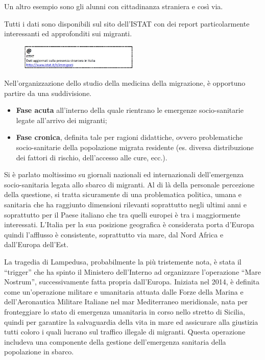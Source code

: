 Un altro esempio sono gli alunni con cittadinanza straniera e così via.

Tutti i dati sono disponibili sul sito dell'ISTAT con dei report
particolarmente interessanti ed approfonditi sui migranti.

\begin{figure}[!ht]
\centering
	\includegraphics[width=0.5\textwidth]{26/image15.jpeg}
	\end{figure}

Nell'organizzazione dello studio della medicina della migrazione, è
opportuno partire da una suddivisione.

\begin{itemize}
\item
  \textbf{Fase acuta} all'interno della quale rientrano le emergenze
  socio-sanitarie legate all'arrivo dei migranti;
\item
  \textbf{Fase cronica}, definita tale per ragioni didattiche, ovvero
  problematiche socio-sanitarie della popolazione migrata residente (es.
  diversa distribuzione dei fattori di rischio, dell'accesso alle cure,
  ecc.).
\end{itemize}

Si è parlato moltissimo su giornali nazionali ed internazionali
dell'emergenza socio-sanitaria legata allo sbarco di migranti. Al di là
della personale percezione della questione, si tratta sicuramente di una
problematica politica, umana e sanitaria che ha raggiunto dimensioni
rilevanti soprattutto negli ultimi anni e soprattutto per il Paese
italiano che tra quelli europei è tra i maggiormente interessati.
L'Italia per la sua posizione geografica è considerata porta d'Europa
quindi l'afflusso è consistente, soprattutto via mare, dal Nord Africa e
dall'Europa dell'Est.

La tragedia di Lampedusa, probabilmente la più tristemente nota, è stata
il ``trigger'' che ha spinto il Ministero dell'Interno ad organizzare
l'operazione ``Mare Nostrum'', successivamente fatta propria
dall'Europa. Iniziata nel 2014, è definita come un'operazione militare e
umanitaria attuata dalle Forze della Marina e dell'Aeronautica Militare
Italiane nel mar Mediterraneo meridionale, nata per fronteggiare lo
stato di emergenza umanitaria in corso nello stretto di Sicilia, quindi
per garantire la salvaguardia della vita in mare ed assicurare alla
giustizia tutti coloro i quali lucrano sul traffico illegale di
migranti. Questa operazione includeva una componente della gestione
dell'emergenza sanitaria della popolazione in sbarco.


